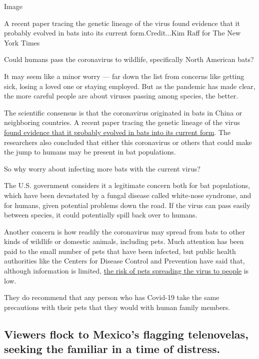Image

A recent paper tracing the genetic lineage of the virus found evidence
that it probably evolved in bats into its current form.Credit...Kim Raff
for The New York Times

Could humans pass the coronavirus to wildlife, specifically North
American bats?

It may seem like a minor worry --- far down the list from concerns like
getting sick, losing a loved one or staying employed. But as the
pandemic has made clear, the more careful people are about viruses
passing among species, the better.

The scientific consensus is that the coronavirus originated in bats in
China or neighboring countries. A recent paper tracing the genetic
lineage of the virus
\href{https://www.nature.com/articles/s41564-020-0771-4}{found evidence
that it probably evolved in bats into its current form}. The researchers
also concluded that either this coronavirus or others that could make
the jump to humans may be present in bat populations.

So why worry about infecting more bats with the current virus?

The U.S. government considers it a legitimate concern both for bat
populations, which have been devastated by a fungal disease called
white-nose syndrome, and for humans, given potential problems down the
road. If the virus can pass easily between species, it could potentially
spill back over to humans.

Another concern is how readily the coronavirus may spread from bats to
other kinds of wildlife or domestic animals, including pets. Much
attention has been paid to the small number of pets that have been
infected, but public health authorities like the Centers for Disease
Control and Prevention have said that, although information is limited,
\href{https://www.cdc.gov/coronavirus/2019-ncov/daily-life-coping/pets.html}{the
risk of pets spreading the virus to people} is low.

They do recommend that any person who has Covid-19 take the same
precautions with their pets that they would with human family members.

\hypertarget{viewers-flock-to-mexicos-flagging-telenovelas-seeking-the-familiar-in-a-time-of-distress}{%
\subsection{Viewers flock to Mexico's flagging telenovelas, seeking the
familiar in a time of
distress.}\label{viewers-flock-to-mexicos-flagging-telenovelas-seeking-the-familiar-in-a-time-of-distress}}

